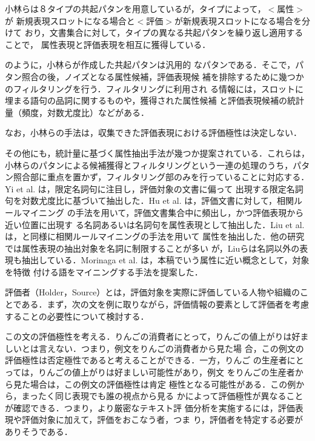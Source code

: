 小林らは８タイプの共起パタンを用意しているが，タイプによって，$<属性>$が
新規表現スロットになる場合と$<評価>$が新規表現スロットになる場合を分けて
おり，文書集合に対して，タイプの異なる共起パタンを繰り返し適用することで，
属性表現と評価表現を相互に獲得している．

のように，小林らが作成した共起パタンは汎用的
なパタンである．そこで，パタン照合の後，ノイズとなる属性候補，評価表現候
補を排除するために幾つかのフィルタリングを行う．フィルタリングに利用され
る情報には，スロットに埋まる語句の品詞に関するものや，獲得された属性候補
と評価表現候補の統計量（頻度，対数尤度比）などがある．

なお，小林らの手法は，収集できた評価表現における評価極性は決定しない．

\vspace{1em}

その他にも，統計量に基づく属性抽出手法が幾つか提案されている．これらは，
小林らのパタンによる候補獲得とフィルタリングという一連の処理のうち，パタ
ン照合部に重点を置かず，フィルタリング部のみを行っていることに対応する．
Yi et al. \cite{yi2005a} は，限定名詞句に注目し，評価対象の文書に偏って
出現する限定名詞句を対数尤度比に基づいて抽出した．Hu et
al. \cite{hu2004a,hu_min2004b}は，評価文書に対して，相関ルールマイニング
の手法を用いて，評価文書集合中に頻出し，かつ評価表現から近い位置に出現す
る名詞あるいは名詞句を属性表現として抽出した．Liu et al. \cite{liu2005a} 
は，\cite{hu2004a,hu_min2004b}と同様に相関ルールマイニングの手法を用いて
属性を抽出した．他の研究では属性表現の抽出対象を名詞に制限することが多い
が，Liuらは名詞以外の表現も抽出している．Morinaga et
al. \cite{morinaga2002a} は，本稿でいう属性に近い概念として，対象を特徴
付ける語をマイニングする手法を提案した．

\label{sec:holder}

評価者（Holder，Source）とは，評価対象を実際に評価している人物や組織のこ
とである．まず，次の文を例に取りながら，評価情報の要素として評価者を考慮
することの必要性について検討する．


この文の評価極性を考える．りんごの消費者にとって，りんごの値上がりは好ま
しいとは言えない．つまり，例文をりんごの消費者から見た場
合，この例文の評価極性は否定極性であると考えることができる．一方，りんご
の生産者にとっては，りんごの値上がりは好ましい可能性があり，例文
をりんごの生産者から見た場合は，この例文の評価極性は肯定
極性となる可能性がある．この例から，まったく同じ表現でも誰の視点から見る
かによって評価極性が異なることが確認できる．つまり，より厳密なテキスト評
価分析を実施するには，評価表現や評価対象に加えて，評価をおこなう者，つま
り，評価者を特定する必要がありそうである．

